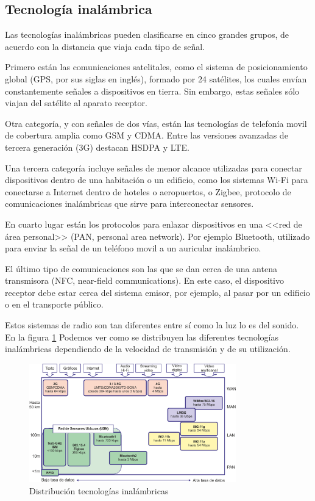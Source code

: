 \subsection{Tecnolog\'ia inal\'ambrica}
Las tecnolog\'ias inal\'ambricas pueden clasificarse en cinco grandes grupos, de acuerdo con la distancia que viaja cada tipo de se\~nal.

Primero est\'an las comunicaciones satelitales, como el sistema de posicionamiento global (GPS, por sus siglas en ingl\'es), formado por 24 sat\'elites, los cuales env\'ian constantemente se\~nales a dispositivos en tierra. Sin embargo, estas se\~nales s\'olo viajan del sat\'elite al aparato receptor.

Otra categor\'ia, y con se\~nales de dos v\'ias, est\'an las tecnolog\'ias de telefon\'ia movil de cobertura amplia como GSM y CDMA. Entre las versiones avanzadas de tercera generaci\'on (3G) destacan HSDPA y LTE.

Una tercera categor\'ia incluye se\~nales de menor alcance utilizadas para conectar dispositivos dentro de una habitaci\'on o un edificio, como los sistemas Wi-Fi para conectarse a Internet dentro de hoteles o aeropuertos, o Zigbee, protocolo de comunicaciones inal\'ambricas que sirve para interconectar sensores.

En cuarto lugar est\'an los protocolos para enlazar dispositivos en una <<red de \'area personal>> (PAN, personal area network). Por ejemplo Bluetooth, utilizado para enviar la se\~nal de un tel\'efono movil a un auricular inal\'ambrico. 

El \'ultimo tipo de comunicaciones son las que se dan cerca de una antena transmisora (NFC, near-field communications). En este caso, el dispositivo receptor debe estar cerca del sistema emisor, por ejemplo, al pasar por un edificio o en el transporte p\'ublico.

Estos sistemas de radio son tan diferentes entre s\'i como la luz lo es del sonido. En la figura \ref{fig:tecinalamb} Podemos ver como se distribuyen las diferentes tecnolog\'ias inal\'ambricas dependiendo de la velocidad de transmisi\'on y de su utilizaci\'on.


 

\begin{figure}[ht]
    \centering
    \includegraphics[width=0.8\textwidth]{imagenes/tec-inalamb.png}
    \caption{Distribución tecnologías inalámbricas}
    \label{fig:tecinalamb}
\end{figure}


